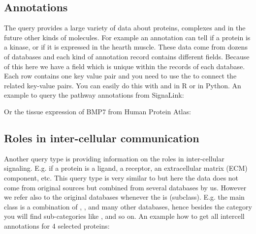 \documentclass[letterpaper,10pt,english]{sphinxmanual}
\begin{document}
\subsection{Annotations}
\label{\detokenize{index:annotations}}
The  query provides a large variety of data about proteins,
complexes and in the future other kinds of molecules. For example an
annotation can tell if a protein is a kinase, or if it is expressed in the
hearth muscle. These data come from dozens of databases and each kind of
annotation record contains different fields. Because of this here we have
a  field which is unique within the records of each database.
Each row contains one key value pair and you need to use the 
to connect the related key-value pairs. You can easily do this with 
and  in R or  in Python. An example to query the pathway
annotations from SignaLink:
\begin{quote}

\end{quote}

Or the tissue expression of BMP7 from Human Protein Atlas:
\begin{quote}

\end{quote}


\subsection{Roles in inter-cellular communication}
\label{\detokenize{index:roles-in-inter-cellular-communication}}
Another query type is  providing information on the roles in
inter-cellular signaling. E.g. if a protein is a ligand, a receptor, an
extracellular matrix (ECM) component, etc. This query type is very similar
to  but here the data does not come from original sources but
combined from several databases by us. However we refer also to the original
databases whenever the  is  (subclass). E.g. the main
class  is a combination of , ,
 and many other databases, hence besides the  category you
will find sub-categories like , 
and so on. An example how to get all intercell annotations for 4 selected
proteins:
\begin{quote}

\end{quote}
\end{document}
